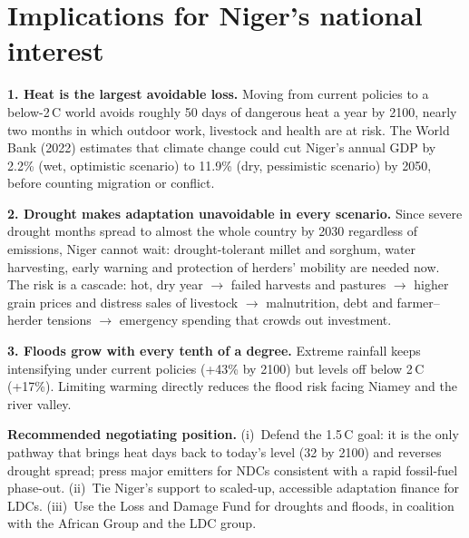 \documentclass[10pt,a4paper]{article}
\newcommand{\degC}{\,\textdegree C}
\begin{document}
\section{Implications for Niger's national interest}

\textbf{1. Heat is the largest avoidable loss.} Moving from current policies to a below-2\degC{} world avoids
roughly 50 days of dangerous heat a year by 2100, nearly two months in which outdoor work, livestock and health
are at risk. The World Bank (2022) estimates that climate change could cut Niger's annual GDP by 2.2\% (wet,
optimistic scenario) to 11.9\% (dry, pessimistic scenario) by 2050, before counting migration or conflict.

\textbf{2. Drought makes adaptation unavoidable in every scenario.} Since severe drought months spread to almost
the whole country by 2030 regardless of emissions, Niger cannot wait: drought-tolerant millet and sorghum, water
harvesting, early warning and protection of herders' mobility are needed now. The risk is a cascade: hot, dry
year $\rightarrow$ failed harvests and pastures $\rightarrow$ higher grain prices and distress sales of
livestock $\rightarrow$ malnutrition, debt and farmer--herder tensions $\rightarrow$ emergency spending that
crowds out investment.

\textbf{3. Floods grow with every tenth of a degree.} Extreme rainfall keeps intensifying under current
policies (+43\% by 2100) but levels off below 2\degC{} (+17\%). Limiting warming directly reduces the flood risk
facing Niamey and the river valley.

\begin{tcolorbox}[colback=lowbg,colframe=lowtxt,boxrule=0pt,leftrule=3pt,arc=0pt,
                  left=7pt,right=7pt,top=3pt,bottom=3pt]
\textbf{Recommended negotiating position.}
(i)~Defend the 1.5\degC{} goal: it is the only pathway that brings heat days back to today's level (32 by 2100)
and reverses drought spread; press major emitters for NDCs consistent with a rapid fossil-fuel phase-out.
(ii)~Tie Niger's support to scaled-up, accessible adaptation finance for LDCs. (iii)~Use the Loss and Damage
Fund for droughts and floods, in coalition with the African Group and the LDC group.
\end{tcolorbox}
\end{document}
